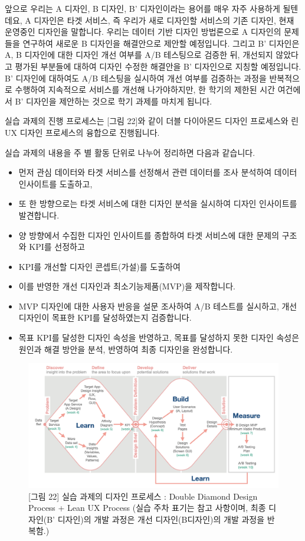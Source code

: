 \documentclass[
  letterpaper,
]{book}
\providecommand{\tightlist}{%
  \setlength{\itemsep}{0pt}\setlength{\parskip}{0pt}}\usepackage{longtable,booktabs,array}
\begin{document}
앞으로 우리는 A 디자인, B 디자인, B' 디자인이라는 용어를 매우 자주
사용하게 될텐데요, A 디자인은 타겟 서비스, 즉 우리가 새로 디자인할
서비스의 기존 디자인, 현재 운영중인 디자인을 말합니다. 우리는 데이터
기반 디자인 방법론으로 A 디자인의 문제들을 연구하여 새로운 B 디자인을
해결안으로 제안할 예정입니다. 그리고 B' 디자인은 A, B 디자인에 대한
디자인 개선 여부를 A/B 테스팅으로 검증한 뒤, 개선되지 않았다고 평가된
부분들에 대하여 디자인 수정한 해결안을 B' 디자인으로 지칭할 예정입니다.
B' 디자인에 대하여도 A/B 테스팅을 실시하여 개선 여부를 검증하는 과정을
반복적으로 수행하여 지속적으로 서비스를 개선해 나가야하지만, 한 학기의
제한된 시간 여건에서 B' 디자인을 제안하는 것으로 학기 과제를 마치게
됩니다.

실습 과제의 진행 프로세스는 {[}그림 22{]}와 같이 더블 다이아몬드 디자인
프로세스와 린 UX 디자인 프로세스의 융합으로 진행됩니다.

실습 과제의 내용을 주 별 활동 단위로 나누어 정리하면 다음과 같습니다.

\begin{itemize}
\tightlist
\item
  먼저 관심 데이터와 타겟 서비스를 선정해서 관련 데이터를 조사 분석하여
  데이터 인사이트를 도출하고,
\item
  또 한 방향으로는 타겟 서비스에 대한 디자인 분석을 실시하여 디자인
  인사이트를 발견합니다.
\item
  양 방향에서 수집한 디자인 인사이트를 종합하여 타겟 서비스에 대한
  문제의 구조와 KPI를 선정하고
\item
  KPI를 개선할 디자인 콘셉트(가설)를 도출하여
\item
  이를 반영한 개선 디자인과 최소기능제품(MVP)을 제작합니다.
\item
  MVP 디자인에 대한 사용자 반응을 설문 조사하여 A/B 테스트를 실시하고,
  개선 디자인이 목표한 KPI를 달성하였는지 검증합니다.
\item
  목표 KPI를 달성한 디자인 속성을 반영하고, 목표를 달성하지 못한 디자인
  속성은 원인과 해결 방안을 분석, 반영하여 최종 디자인을 완성합니다.
\end{itemize}

\begin{figure}[H]

{\centering \includegraphics{img/fig22.png}

}

\caption{{[}그림 22{]} 실습 과제의 디자인 프로세스 : Double Diamond
Design Process + Lean UX Process (실습 주차 표기는 참고 사항이며, 최종
디자인(B' 디자인)의 개발 과정은 개선 디자인(B디자인)의 개발 과정을
반복함.)}

\end{figure}%
\end{document}
